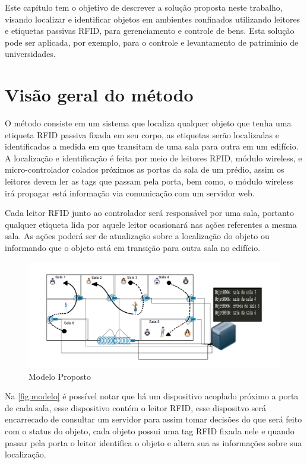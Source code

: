 \label{chapter:metodo}

Este capítulo tem o objetivo de descrever a solução proposta neste trabalho, visando localizar e identificar objetos 
em ambientes confinados utilizando leitores e etiquetas passivas RFID, para gerenciamento e controle de bens.
%
Esta solução pode ser aplicada, por exemplo, para o controle e levantamento de patriminio de universidades.

%
%
\section{Visão geral do método}

O método consiste em um sistema que localiza qualquer objeto que tenha uma etiqueta RFID passiva fixada em seu corpo, 
as etiquetas serão localizadas e identificadas a medida em que transitam de uma sala para outra em um edifício. 
%
A localização e identificação é feita por meio de leitores RFID, módulo wireless, e micro-controlador colados próximos as portas da sala
de um prédio, assim os leitores devem ler as tags que passam pela porta, bem como, o módulo wireless irá propagar está informação via 
comunicação com um servidor web.


Cada leitor RFID junto ao controlador será responsável por uma sala, portanto qualquer etiqueta lida por aquele leitor 
ocasionará nas ações referentes a mesma sala. As ações poderá ser de atualização sobre a localização do objeto ou informando 
que o objeto está em transição para outra sala no edifício.
\begin{figure}[H]
              \caption{\label{fig:modelo}{Modelo Proposto}}
              \centering
              \includegraphics[width=1.1\textwidth]{Figuras/bigpicture.png}
        \end{figure}

\par
Na \autoref{fig:modelo} é possível notar que há um dispositivo acoplado próximo a 
porta de cada sala, esse dispositivo contém o leitor RFID, esse dispositvo será encarrecado de consultar um 
servidor para assim tomar decisões do que será feito com o status do objeto, cada objeto possui uma tag RFID fixada 
nele e quando passar pela porta o leitor identifica o objeto e altera sua as informações sobre sua localização.

